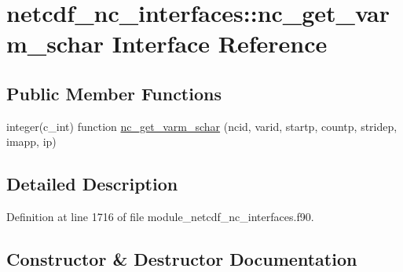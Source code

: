 \hypertarget{interfacenetcdf__nc__interfaces_1_1nc__get__varm__schar}{}\section{netcdf\+\_\+nc\+\_\+interfaces\+:\+:nc\+\_\+get\+\_\+varm\+\_\+schar Interface Reference}
\label{interfacenetcdf__nc__interfaces_1_1nc__get__varm__schar}
\subsection*{Public Member Functions}
\begin{DoxyCompactItemize}
\item 
integer(c\+\_\+int) function \hyperlink{interfacenetcdf__nc__interfaces_1_1nc__get__varm__schar_aef8fc94816e79f8c6a66bd9e206e0604}{nc\+\_\+get\+\_\+varm\+\_\+schar} (ncid, varid, startp, countp, stridep, imapp, ip)
\end{DoxyCompactItemize}


\subsection{Detailed Description}


Definition at line 1716 of file module\+\_\+netcdf\+\_\+nc\+\_\+interfaces.\+f90.



\subsection{Constructor \& Destructor Documentation}
\mbox{\label{interfacenetcdf__nc__interfaces_1_1nc__get__varm__schar_aef8fc94816e79f8c6a66bd9e206e0604}} 
